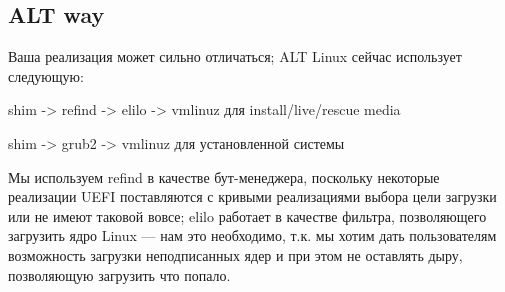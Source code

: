 \documentclass[10pt, a5paper]{article}
\begin{document}
\subsection*{ALT way}

Ваша  реализация может сильно отличаться; ALT Linux сейчас использует следующую: 

shim -> refind -> elilo -> vmlinuz для install/live/rescue media 

shim -> grub2 -> vmlinuz для установленной системы

Мы используем refind в качестве бут-менеджера, поскольку некоторые реализации UEFI поставляются с кривыми реализациями выбора цели загрузки или не имеют таковой вовсе; elilo работает в качестве фильтра, позволяющего загрузить ядро Linux --- нам это необходимо, т.к. мы хотим дать пользователям возможность загрузки неподписанных ядер и при этом не оставлять дыру, позволяющую загрузить что попало.
\end{document}

